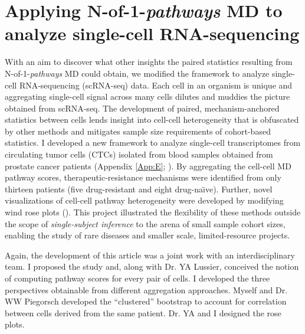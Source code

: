 \chapter{Applying N-of-1-\emph{pathways} MD to analyze single-cell RNA-sequencing} \label{Chap:ctcs}

\indent \indent With an aim to discover what other insights the paired statistics resulting from N-of-1-\emph{pathways} MD could obtain, we modified the framework to analyze single-cell RNA-sequencing (scRNA-seq) data. Each cell in an organism is unique and aggregating single-cell signal across many cells dilutes and muddies the picture obtained from scRNA-seq. The development of paired, mechanism-anchored statistics between cells lends insight into cell-cell heterogeneity that is obfuscated by other methods and mitigates sample size requirements of cohort-based statistics. I developed a new framework to analyze single-cell transcriptomes from circulating tumor cells (CTCs) isolated from blood samples obtained from prostate cancer patients (Appendix \ref{App:E}; \cite{Patel2014,Schissler2016}). By aggregating the cell-cell MD pathway scores, therapeutic-resistance mechanisms were identified from only thirteen patients (five drug-resistant and eight drug-na\"{\i}ve). Further, novel visualizations of cell-cell pathway heterogeneity were developed by modifying wind rose plots (\cite{Court1963}). This project illustrated the flexibility of these methods outside the scope of \emph{single-subject inference} to the arena of small sample cohort sizes, enabling the study of rare diseases and smaller scale, limited-resource projects.

Again, the development of this article was a joint work with an interdisciplinary team. I proposed the study and, along with Dr. YA Lussier, conceived the notion of computing pathway scores for every pair of cells. I developed the three perspectives obtainable from different aggregation approaches. Myself and Dr. WW Piegorsch developed the ``clustered'' bootstrap to account for correlation between cells derived from the same patient. Dr. YA and I designed the rose plots.
